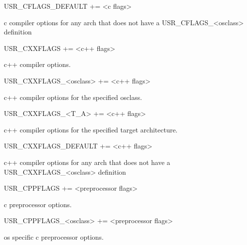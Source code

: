 \begin{description}\item USR\_CFLAGS\_DEFAULT += \textless{}c flags\textgreater{}

\end{description}c compiler options for any arch that does not have a USR\_CFLAGS\_\textless{}osclass\textgreater{} definition

\begin{description}\item {}USR\_CXXFLAGS += \textless{}c++ flags\textgreater{}

\end{description}c++ compiler options.

\begin{description}\item USR\_CXXFLAGS\_\textless{}osclass\textgreater{} += \textless{}c++ flags\textgreater{}

\end{description}c++ compiler options for the specified osclass.

\begin{description}\item USR\_CXXFLAGS\_\textless{}T\_A\textgreater{} += \textless{}c++ flags\textgreater{}

\end{description}c++ compiler options for the specified target architecture.

\begin{description}\item USR\_CXXFLAGS\_DEFAULT += \textless{}c++ flags\textgreater{}

\end{description}c++ compiler options for any arch that does not have a USR\_CXXFLAGS\_\textless{}osclass\textgreater{} definition

\begin{description}\item {}USR\_CPPFLAGS += \textless{}preprocessor flags\textgreater{}

\end{description}c preprocessor options.

\begin{description}\item USR\_CPPFLAGS\_\textless{}osclass\textgreater{} += \textless{}preprocessor flags\textgreater{}

\end{description}os specific c preprocessor options.

